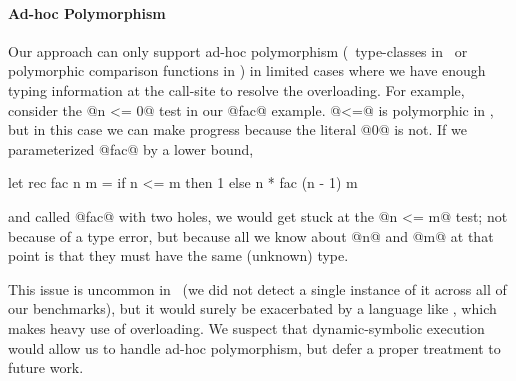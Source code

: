 \paragraph{Ad-hoc Polymorphism}
Our approach can only support ad-hoc polymorphism (\eg\ type-classes in
\haskell\ or polymorphic comparison functions in \ocaml) in limited cases
where we have enough typing information at the call-site to resolve the
overloading. For example, consider the @n <= 0@ test in our @fac@ example.
@<=@ is polymorphic in \ocaml, but in this case we can make progress because
the literal @0@ is not. If we parameterized @fac@ by a lower bound, \eg
%
\begin{code}
  let rec fac n m =
    if n <= m then
      1
    else
      n * fac (n - 1) m
\end{code}
%
and called @fac@ with two holes, we would get stuck at the @n <= m@
test; not because of a type error, but because all we know about
@n@ and @m@ at that point is that they must have the same (unknown)
type.

This issue is uncommon in \ocaml\ (we did not detect a single instance
of it across all of our benchmarks), but it would surely be exacerbated
by a language like \haskell, which makes heavy use of overloading. We
suspect that dynamic-symbolic execution would allow us to handle ad-hoc
polymorphism, but defer a proper treatment to future work.


